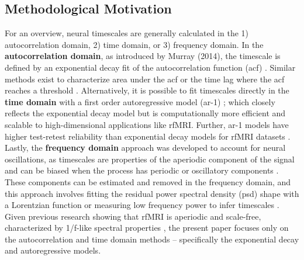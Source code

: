 \documentclass[latex/main.tex]{subfiles}
\begin{document}
\subsection{Methodological Motivation}
For an overview, neural timescales are generally calculated in the 1) autocorrelation domain, 2) time domain, or 3) frequency domain. In the \textbf{autocorrelation domain}, as introduced by Murray (2014), the timescale is defined by an exponential decay fit of the autocorrelation function (acf) \cite{murray_hierarchy_2014, rossi-pool_invariant_2021, cirillo_neural_2018, ito_cortical_2020, runyan_distinct_2017, zeraati_flexible_2022, nougaret_intrinsic_2021, wasmuht_intrinsic_2018, muller_core_2020, maisson_choice-relevant_2021, li_hierarchical_2022, shafiei_topographic_2020}. Similar methods exist to characterize area under the acf \cite{wengler_distinct_2020, manea_intrinsic_2022, watanabe_atypical_2019} or the time lag where the acf reaches a threshold \cite{zilio_are_2021, raut_hierarchical_2020, golesorkhi_temporal_2021}. Alternatively, it is possible to fit timescales directly in the \textbf{time domain} with a first order autoregressive model (ar-1) \cite{kaneoke_variance_2012, meisel_decline_2017, huang_timescales_2018, lurie_cortical_2024, shinn_functional_2023, shafiei_topographic_2020}; which closely reflects the exponential decay model \cite{murray_hierarchy_2014} but is computationally more efficient and scalable to high-dimensional applications like rfMRI. Further, ar-1 models have higher test-retest reliability than exponential decay models for rfMRI datasets \cite{huang_timescales_2018, lurie_cortical_2024}. Lastly, the \textbf{frequency domain} approach was developed to account for neural oscillations, as timescales are properties of the aperiodic component of the signal and can be biased when the process has periodic or oscillatory components \cite{donoghue_parameterizing_2020, gao_neuronal_2020}. These components can be estimated and removed in the frequency domain, and this approach involves fitting the residual power spectral density (psd) shape with a Lorentzian function or measuring low frequency power to infer timescales \cite{gao_neuronal_2020, zeraati_flexible_2022, fallon_timescales_2020}. Given previous research showing that rfMRI is aperiodic and scale-free, characterized by 1/f-like spectral properties \cite{he_scale-free_2011, he_temporal_2010}, the present paper focuses only on the autocorrelation and time domain methods -- specifically the exponential decay and autoregressive models.\\ 
\end{document}
